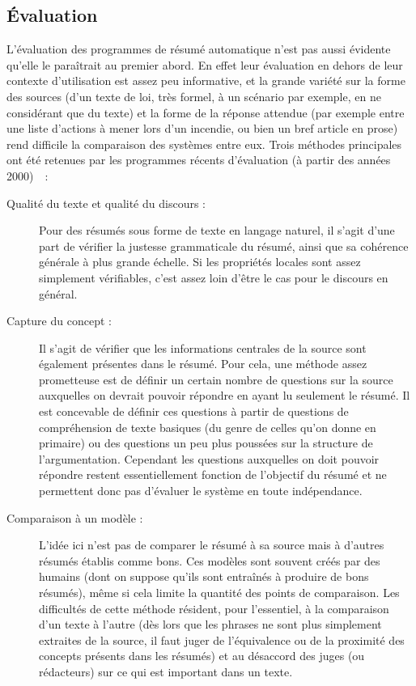 \documentclass{article}           %
\begin{document}
\subsection{Évaluation}

L'évaluation des programmes de résumé automatique n'est pas aussi évidente qu'elle le paraîtrait au premier abord. En effet leur évaluation en dehors de leur contexte d'utilisation est assez peu informative, et la grande variété sur la forme des sources (d'un texte de loi, très formel, à un scénario par exemple, en ne considérant que du texte) et la forme de la réponse attendue (par exemple entre une liste d'actions à mener lors d'un incendie, ou bien un bref article en prose) rend difficile la comparaison des systèmes entre eux. Trois méthodes principales ont été retenues par les programmes récents d'évaluation (à partir des années 2000)~\cite[p.1453-1461]{jones_automatic_2007}~:
\begin{description}
  \item [Qualité du texte et qualité du discours :] Pour des résumés sous forme de texte en langage naturel, il s'agit d'une part de vérifier la justesse grammaticale du résumé, ainsi que sa cohérence générale à plus grande échelle. Si les propriétés locales sont assez simplement vérifiables, c'est assez loin d'être le cas pour le discours en général.
  \item [Capture du concept :] Il s'agit de vérifier que les informations centrales de la source sont également présentes dans le résumé. Pour cela, une méthode assez prometteuse est de définir un certain nombre de questions sur la source auxquelles on devrait pouvoir répondre en ayant lu seulement le résumé. Il est concevable de définir ces questions à partir de questions de compréhension de texte basiques (du genre de celles qu'on donne en primaire) ou des questions un peu plus poussées sur la structure de l'argumentation. Cependant les questions auxquelles on doit pouvoir répondre restent essentiellement fonction de l'objectif du résumé et ne permettent donc pas d'évaluer le système en toute indépendance.
  \item [Comparaison à un modèle :] L'idée ici n'est pas de comparer le résumé à sa source mais à d'autres résumés établis comme bons. Ces modèles sont souvent créés par des humains (dont on suppose qu'ils sont entraînés à produire de bons résumés), même si cela limite la quantité des points de comparaison. Les difficultés de cette méthode résident, pour l'essentiel, à la comparaison d'un texte à l'autre (dès lors que les phrases ne sont plus simplement extraites de la source, il faut juger de l'équivalence ou de la proximité des concepts présents dans les résumés) et au désaccord des juges (ou rédacteurs) sur ce qui est important dans un texte.
 \end{description}
  
\end{document}
